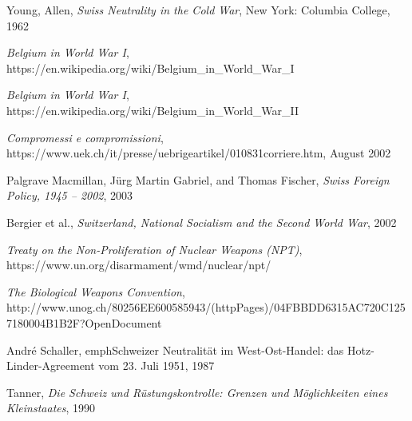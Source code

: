\documentclass[a4paper]{article}
\begin{document}
\begin{thebibliography}{9}
\begin{comment}
\bibitem{nano3}
The Swiss ambassador to China to the Division of Political Affairs, 29 May 1973, SFA, E2001E-01\#1987/78\#2400*.


\bibitem{nano3}
Marc Perrenoud, \emph{Switzerland's relationship with Africa during decolonisation and the beginnings of development cooperation}, International Development Policy, Revue internationale de politique de d\'eveloppement, http://poldev.revues.org/140, March 2010
 
\bibitem{nano3}
Purtschert, Patricia, and Harald Fischer-Tiné, \emph{Colonial Switzerland: Rethinking Colonialism from the Margins}, 2015.
 
\bibitem{nano3}
Benjamin Talton, \emph{The Challenge of Decolonization in Africa}, Temple University, http://exhibitions.nypl.org/africanaage/essay-challenge-of-decolonization-africa.html
\end{comment}
Young, Allen, \emph{Swiss Neutrality in the Cold War}, New York: Columbia College, 1962

\label{reference2}
\emph{Belgium in World War I}, https://en.wikipedia.org/wiki/Belgium\_in\_World\_War\_I

\label{reference1}
\emph{Belgium in World War I}, https://en.wikipedia.org/wiki/Belgium\_in\_World\_War\_II

\label{reference3}
\emph{Compromessi e compromissioni}, https://www.uek.ch/it/presse/uebrigeartikel/010831corriere.htm, August 2002

\label{reference4}
  Palgrave Macmillan, J\"{u}rg Martin Gabriel, and Thomas Fischer, \emph{Swiss Foreign Policy, 1945 -- 2002}, 2003

\label{reference5}
Bergier et al., \emph{Switzerland, National Socialism and the Second World War}, 2002

\label{reference6}
\emph{Treaty on the Non-Proliferation of Nuclear Weapons (NPT)}, https://www.un.org/disarmament/wmd/nuclear/npt/

\label{reference7}
\emph{The Biological Weapons Convention}, http://www.unog.ch/80256EE600585943/(httpPages)/04FBBDD6315AC720C1257180004B1B2F?OpenDocument

\label{reference8}
André Schaller, emph{Schweizer Neutralität im West-Ost-Handel: das Hotz-Linder-Agreement vom 23. Juli 1951}, 1987

\label{reference9}
Tanner, \emph{Die Schweiz und Rüstungskontrolle: Grenzen und Möglichkeiten eines Kleinstaates}, 1990


\end{thebibliography}
\end{document}
